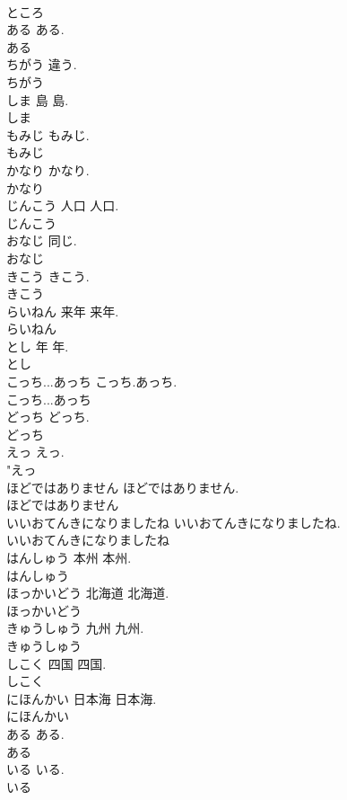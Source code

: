 \documentclass[8pt]{extreport}
\begin{document}
\begin{CJK}{UTF8}{min}
\\	ところ
\\	ある		ある.	
\\	ある
\\	ちがう		違う.	
\\	ちがう
\\	しま	島	島.	
\\	しま
\\	もみじ		もみじ.	
\\	もみじ
\\	かなり		かなり.	
\\	かなり
\\	じんこう	人口	人口.	
\\	じんこう
\\	おなじ		同じ.	
\\	おなじ
\\	きこう		きこう.	
\\	きこう
\\	らいねん	来年	来年.	
\\	らいねん
\\	とし	年	年.	
\\	とし
\\	こっち...あっち		こっち.あっち.	
\\	こっち...あっち
\\	どっち		どっち.	
\\	どっち
\\	えっ		えっ.	
\\	"えっ
\\	ほどではありません		ほどではありません.	
\\	ほどではありません
\\	いいおてんきになりましたね		いいおてんきになりましたね.	
\\	いいおてんきになりましたね
\\	はんしゅう	本州	本州.	
\\	はんしゅう
\\	ほっかいどう	北海道	北海道.	
\\	ほっかいどう
\\	きゅうしゅう	九州	九州.	
\\	きゅうしゅう
\\	しこく	四国	四国.	
\\	しこく
\\	にほんかい	日本海	日本海.	
\\	にほんかい
\\	ある		ある.	
\\	ある
\\	いる		いる.	
\\	いる

\end{CJK}
\end{document}
